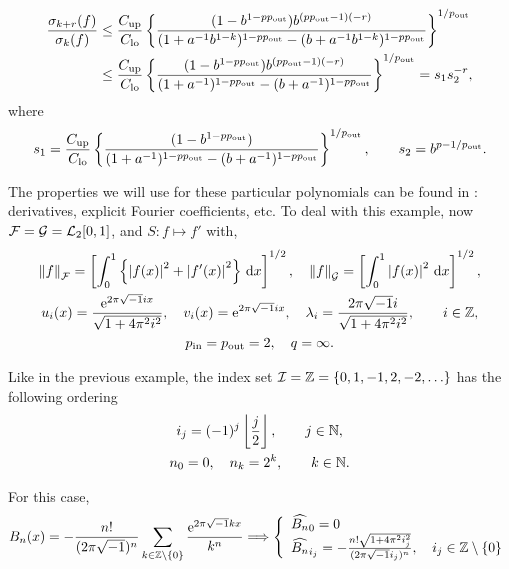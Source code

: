 \documentclass[final]{elsarticle}
\newcommand{\pin}{p_{\text{\rm{in}}}}
\newcommand{\pout}{p_{\text{\rm{out}}}}
\theoremstyle{definition}
\theoremstyle{remark}
\DeclareMathOperator{\up}{up}
\DeclareMathOperator{\lo}{lo}
\begin{document}
\begin{itemize}
\begin{multline*}
\end{multline*}
\begin{align*}
\frac{\sigma_{k+r}(f)}{\sigma_k(f)} &\le \frac{C_{\up}}  {C_{\lo}}
\left\{\frac{ (1 - b^{1-p \pout}) b^{(p \pout -1)(-r)} }  {(1+a^{-1}b^{1-k})^{1-p\pout} - (b+a^{-1}b^{1-k})^{1-p\pout}} \right\}^{1/\pout}\\
& \le \frac{C_{\up}}  {C_{\lo}}
\left\{\frac{(1 - b^{1-p\pout}) b^{(p \pout -1)(-r)} }  {(1+a^{-1})^{1-p\pout} - (b+a^{-1})^{1-p\pout}} \right\}^{1/\pout}   = s_1 s_2^{-r},
\end{align*}
where
\[
s_1 = \frac{ C_{\up}}  {C_{\lo}}\left\{\frac{(1 - b^{1-p\pout})}  {(1+a^{-1})^{1-p\pout} - (b+a^{-1})^{1-p\pout} } \right\}^{1/\pout}, \qquad s_2 = b^{p-1/\pout}.
\]

The properties we will use for these particular polynomials can be found in \cite{AbrSte64}: derivatives, explicit Fourier coefficients, etc. To deal with this example, now $\mathcal{F}=\mathcal{G}=\mathcal{L}_2[0,1]$, and $S: f \mapsto f'$ with,
\begin{gather*}
\norm[\cf]{f} = \left[\int_0^1 \left\{\abs{f(x)}^2 + \abs{f'(x)}^2\right\}\, \dif x\right]^{1/2}, \quad \norm[\cg]{f} = \left[\int_0^1 \abs{f(x)}^2 \, \dif x \right]^{1/2}, \\
u_{i}(x) = \frac{\me^{2 \pi \sqrt{-1} i x}}{\sqrt{1+4 \pi^2 i^2}}, \quad v_i(x) = \me^{2 \pi \sqrt{-1} i x}, \quad \lambda_i=\frac{2 \pi \sqrt{-1} i}{\sqrt{1+4 \pi^2 i^2}}, \qquad i \in \integers,\\
\pin=\pout=2,\quad q=\infty.
\end{gather*}

Like in the previous example, the index set $\mathcal{I}=\mathbb{Z}=\{0,1,-1,2,-2,\ldots\}$ has the following ordering
\begin{gather*}
i_j=(-1)^{j}\left\lfloor\frac{j}{2}\right\rfloor,\qquad j\in\mathbb{N},\\
n_0=0,\quad n_k=2^k, \qquad k\in\mathbb{N}.
\end{gather*}

For this case,
\begin{equation*}
B_n(x)=-\frac{n!}{(2\pi\sqrt{-1})^n}\sum_{k\in\mathbb{Z}\setminus\{0\}}\frac{\mathrm{e}^{2\pi\sqrt{-1}kx}}{k^n}\Longrightarrow
\left\{\begin{array}{l}
\widehat{B_n}_0=0 \\
\widehat{B_n}_{i_j}=-\frac{n!\sqrt{1+4 \pi^2 i_j^2}}{(2\pi\sqrt{-1}i_j)^n},\quad i_j\in\mathbb{Z}\setminus\{0\}
\end{array}\right.
\end{equation*}


\end{itemize}
\end{document}

